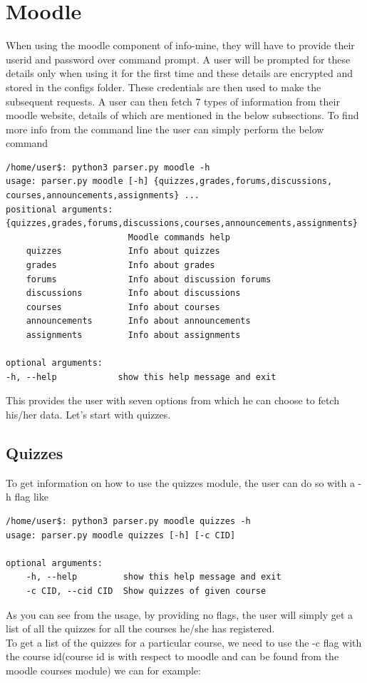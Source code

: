 \documentclass[12pt, letterpaper, twoside]{article}
\begin{document}
\section{Moodle}
When using the moodle component of info-mine, they will have to provide their userid and password over command prompt.
A user will be prompted for these details only when using it for the first time and these details are encrypted and stored in the configs
folder. 
These credentials are then used to make the subsequent requests.
A user can then fetch 7 types of information from their moodle website, details of which are mentioned in the below subsections.
To find more info from the command line the user can simply perform the below command
\begin{verbatim}
/home/user$: python3 parser.py moodle -h
usage: parser.py moodle [-h] {quizzes,grades,forums,discussions,
courses,announcements,assignments} ...
positional arguments:
{quizzes,grades,forums,discussions,courses,announcements,assignments}
                        Moodle commands help
    quizzes             Info about quizzes
    grades              Info about grades
    forums              Info about discussion forums
    discussions         Info about discussions
    courses             Info about courses
    announcements       Info about announcements
    assignments         Info about assignments

optional arguments:
-h, --help            show this help message and exit

\end{verbatim}
    This provides the user with seven options from which he can choose to fetch his/her data.
    Let's start with quizzes.
\subsection{Quizzes}
To get information on how to use the quizzes module, the user can do so with a -h flag like
\begin{verbatim}
/home/user$: python3 parser.py moodle quizzes -h
usage: parser.py moodle quizzes [-h] [-c CID]

optional arguments:
    -h, --help         show this help message and exit
    -c CID, --cid CID  Show quizzes of given course
\end{verbatim}
As you can see from the usage, by providing no flags, the user will simply get a list of all the quizzes for all the courses he/she has registered.\\
To get a list of the quizzes for a particular course, we need to use the -c flag with the course id(course id is with respect to moodle and can be found from the moodle courses module) we can for example:
\end{document}
